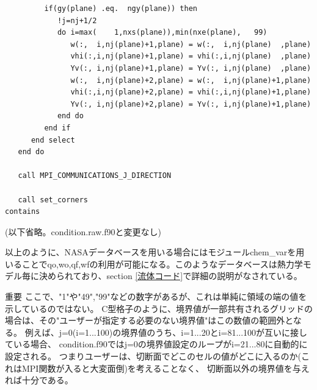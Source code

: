 \documentclass{jsarticle}
\begin{document}
\begin{verbatim}
         if(gy(plane) .eq.  ngy(plane)) then
            !j=nj+1/2
            do i=max(    1,nxs(plane)),min(nxe(plane),   99)
               w(:,  i,nj(plane)+1,plane) = w(:,  i,nj(plane)  ,plane)
               vhi(:,i,nj(plane)+1,plane) = vhi(:,i,nj(plane)  ,plane)
               Yv(:, i,nj(plane)+1,plane) = Yv(:, i,nj(plane)  ,plane)
               w(:,  i,nj(plane)+2,plane) = w(:,  i,nj(plane)+1,plane)
               vhi(:,i,nj(plane)+2,plane) = vhi(:,i,nj(plane)+1,plane)
               Yv(:, i,nj(plane)+2,plane) = Yv(:, i,nj(plane)+1,plane)
            end do
         end if
      end select
   end do

   call MPI_COMMUNICATIONS_J_DIRECTION

   call set_corners
contains

\end{verbatim}%

(以下省略。condition.raw.f90と変更なし)


\hspace{1em}


以上のように、NASAデータベースを用いる場合にはモジュールchem\_varを用いることでqo,wo,qf,wfの利用が可能になる。このようなデータベースは熱力学モデル毎に決められており、section \ref{流体コード}で詳細の説明がなされている。

\begin{itembox}[l]{重要}
ここで、"1"や"49","99"などの数字があるが、これは単純に領域の端の値を示しているのではない。
C型格子のように、境界値が一部共有されるグリッドの場合は、その"ユーザーが指定する必要のない境界値"はこの数値の範囲外となる。
例えば、j=0(i=1...100)の境界値のうち、i=1...20とi=81...100が互いに接している場合、
condition.f90ではj=0の境界値設定のループがi=21...80に自動的に設定される。
つまりユーザーは、切断面でどこのセルの値がどこに入るのか(これはMPI関数が入ると大変面倒)を考えることなく、
切断面以外の境界値を与えれば十分である。
\end{itembox}
\end{document}

